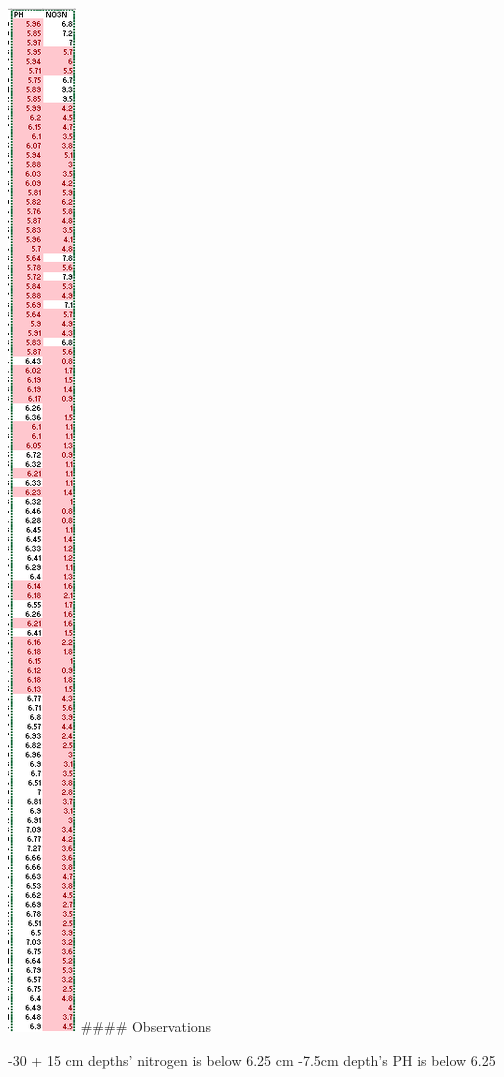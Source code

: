 \documentclass[
  letterpaper,
  DIV=11,
  numbers=noendperiod]{scrreprt}
\begin{document}
\includegraphics{./Excel_1_Unit/Week1_Diego/Week_1DJ/screenshots/Soil5.png}
\#\#\#\# Observations

-30 + 15 cm depths' nitrogen is below 6.25 cm -7.5cm depth's PH is below
6.25
\end{document}
